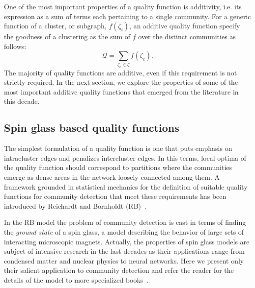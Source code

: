 One of the most important properties of a quality function is additivity, i.e. its expression as a sum of terms each pertaining to a single community.
For a generic function of a cluster, or subgraph, $f(\zeta_i)$, an additive quality function specify the goodness of a clustering as the sum of $f$ over the distinct communities as follows:
\begin{equation}\label{eq:additive_quality}
\mathcal{Q} = \sum \limits_{\zeta_c \in \zeta} f(\zeta_c).
\end{equation}
The majority of quality functions are additive, even if this requirement is not strictly required.
In the next section, we explore the properties of some of the most important additive quality functions that emerged from the literature in this decade.

\subsection{Spin glass based quality functions}
The simplest formulation of a quality function is one that puts emphasis on intracluster edges and penalizes intercluster edges.
In this terms, local optima of the quality function should correspond to partitions where the communities emerge as dense areas in the network loosely connected among them.
A framework grounded in statistical mechanics for the definition of suitable quality functions for community detection that meet these requirements has been introduced by Reichardt and Bornholdt (RB)~\cite{reichardt2006}.

In the RB model the problem of community detection is cast in terms of finding the \emph{ground state} of a spin glass, a model describing the behavior of large sets of interacting microscopic magnets.
Actually, the properties of spin glass models are subject of intensive research in the last decades as their applications range from condensed matter and nuclear physics to neural networks. Here we present only their salient application to community detection and refer the reader for the details of the model to more specialized books~\cite{mezard1990}.

